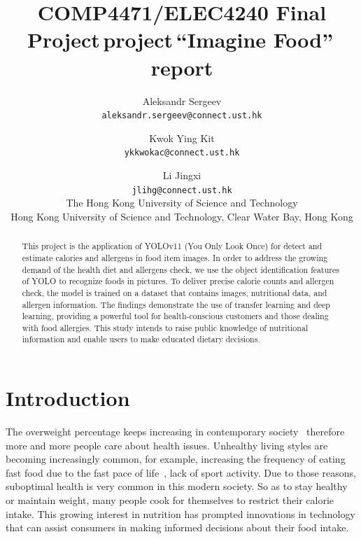 \documentclass[10pt,twocolumn,letterpaper]{article}
\def\cvprPaperID{``Imagine Food''}
\def\confName{COMP4471/ELEC4240 Final Project}
\begin{document}
\title{\confName\,project\,\cvprPaperID\,report}

\author{
    Aleksandr Sergeev\\
    {\tt\small aleksandr.sergeev@connect.ust.hk}
    \and
    Kwok Ying Kit\\
    {\tt\small ykkwokac@connect.ust.hk}
    \and
    Li Jingxi\\
    {\tt\small jlihg@connect.ust.hk}\\
    The Hong Kong University of Science and Technology\\
    Hong Kong University of Science and Technology, Clear Water Bay, Hong Kong
}
\maketitle


\begin{abstract}
        This project is the application of YOLOv11 (You Only Look Once) for detect and estimate calories and allergens in food item images.
        In order to address the growing demand of the health diet and allergens check, we use the object identification features of YOLO to recognize foods in pictures.
        To deliver precise calorie counts and allergen check, the model is trained on a dataset that contains images, nutritional data, and allergen information.
        The findings demonstrate the use of transfer learning and deep learning, providing a powerful tool for health-conscious customers and those dealing with food allergies.
        This study intends to raise public knowledge of nutritional information and enable users to make educated dietary decisions.
\end{abstract}


\section{Introduction}\label{sec:intro}

The overweight percentage keeps increasing in contemporary society~\cite{nihoverweightobesity} therefore more and more people care about health issues.
Unhealthy living styles are becoming increasingly common, for example, increasing the frequency of eating fast food due to the fast pace of life~\cite{worldpopulationreviewfastfood}, lack of sport activity.
Due to those reasons, suboptimal health is very common in this modern society.
So as to stay healthy or maintain weight, many people cook for themselves to restrict their calorie intake.
This growing interest in nutrition has prompted innovations in technology that can assist consumers in making informed decisions about their food intake.
\end{document}
